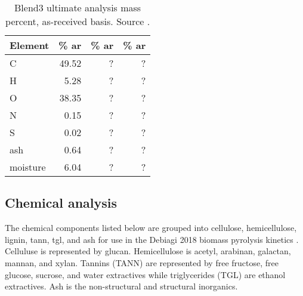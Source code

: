 \begin{table}[H]
    \centering
    \caption{Blend3 ultimate analysis mass percent, as-received basis. Source \cite{Choratch-2017}.}
    \begin{tabular}{lrrr}
        \toprule
        Element & \% ar & \% ar & \% ar \\
        \midrule
        C        & 49.52   & ? & ? \\
        H        & 5.28    & ? & ? \\
        O        & 38.35   & ? & ? \\
        N        & 0.15    & ? & ? \\
        S        & 0.02    & ? & ? \\
        ash      & 0.64    & ? & ? \\
        moisture & 6.04    & ? & ? \\
        \bottomrule
    \end{tabular}
\end{table}

\subsection{Chemical analysis}

The chemical components listed below are grouped into cellulose, hemicellulose, lignin, tann, tgl, and ash for use in the Debiagi 2018 biomass pyrolysis kinetics \cite{Debiagi-2018}. Celluluse is represented by glucan. Hemicellulose is acetyl, arabinan, galactan, mannan, and xylan. Tannins (TANN) are represented by free fructose, free glucose, sucrose, and water extractives while triglycerides (TGL) are ethanol extractives. Ash is the non-structural and structural inorganics.

